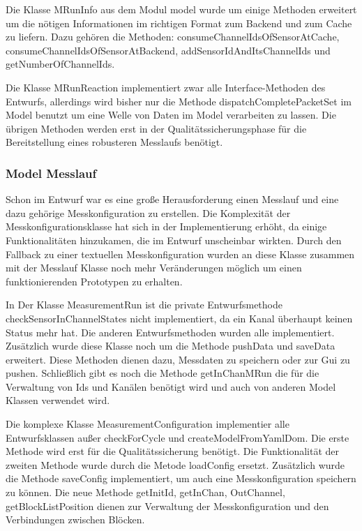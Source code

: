 \documentclass[parskip=full]{scrartcl}
\begin{document}
Die Klasse MRunInfo aus dem Modul model wurde um einige Methoden erweitert um die nötigen Informationen im richtigen Format zum Backend und zum Cache zu liefern. Dazu gehören die Methoden: consumeChannelIdsOfSensorAtCache, consumeChannelIdsOfSensorAtBackend, addSensorIdAndItsChannelIds und getNumberOfChannelIds. 

Die Klasse MRunReaction implementiert zwar alle Interface-Methoden des Entwurfs, allerdings wird bisher nur die Methode dispatchCompletePacketSet im Model benutzt um eine Welle von Daten im Model verarbeiten zu lassen. Die übrigen Methoden werden erst in der Qualitätssicherungsphase für die Bereitstellung eines robusteren Messlaufs benötigt.

\subsubsection{Model Messlauf}

Schon im Entwurf war es eine große Herausforderung einen Messlauf und eine dazu gehörige Messkonfiguration zu erstellen. Die Komplexität der Messkonfigurationsklasse hat sich in der Implementierung erhöht, da einige Funktionalitäten hinzukamen, die im Entwurf unscheinbar wirkten. Durch den Fallback zu einer textuellen Messkonfiguration wurden an diese Klasse zusammen mit der Messlauf Klasse noch mehr Veränderungen möglich um einen funktionierenden Prototypen zu erhalten.

In Der Klasse MeasurementRun ist die private Entwurfsmethode checkSensorInChannelStates nicht implementiert, da ein Kanal überhaupt keinen Status mehr hat. Die anderen Entwurfsmethoden wurden alle implementiert. Zusätzlich wurde diese Klasse noch um die Methode pushData und saveData erweitert. Diese Methoden dienen dazu, Messdaten zu speichern oder zur Gui zu pushen. Schließlich gibt es noch die Methode getInChanMRun die für die Verwaltung von Ids und Kanälen benötigt wird und auch von anderen Model Klassen verwendet wird.

Die komplexe Klasse MeasurementConfiguration implementier alle Entwurfsklassen außer checkForCycle und createModelFromYamlDom. Die erste Methode wird erst für die Qualitätssicherung benötigt. Die Funktionalität der zweiten Methode wurde durch die Metode loadConfig ersetzt. Zusätzlich wurde die Methode saveConfig implementiert, um auch eine Messkonfiguration speichern zu können. Die neue Methode getInitId, getInChan, OutChannel, getBlockListPosition dienen zur Verwaltung der Messkonfiguration und den Verbindungen zwischen Blöcken.
\end{document}
